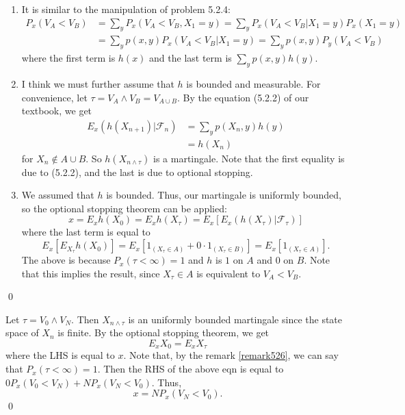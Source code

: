 \begin{problem}[5.2.7]\hfill
	
	\begin{enumerate}
		\item It is similar to the manipulation of problem 5.2.4: 
			\[
				\begin{split}
					P_x\left( V_A < V_B \right) & = \sum_{y}P_x\left( V_A < V_B, X_1 = y \right)
					= \sum_{y}P_x\left( V_A < V_B \lvert X_1 = y \right)P_x\left( X_1 = y \right) \\
					& = \sum_{y}p(x, y) P_x\left( V_A < V_B \lvert X_1 = y \right) = \sum_{y}p(x, y)P_y\left( V_A < V_B \right)
				\end{split}
			\]
			where the first term is $h(x)$ and the last term is $\sum_{y}p(x, y)h(y)$.

		\item I think we must further assume that $h$ is bounded and measurable.
			For convenience, let $\tau = V_A \wedge V_B = V_{A \cup B}$.
			By the equation (5.2.2) of our textbook, we get
			\[
				\begin{split}
					E_x\left( h(X_{n+1}) \lvert \mathcal{F}_n \right)
					&= \sum_y p(X_n, y)h(y) \\
					&= h(X_n)
				\end{split}
			\]
			for $X_n \notin A\cup B$.
			So $h(X_{n\wedge \tau})$ is a martingale.
			Note that the first equality is due to (5.2.2), and the last is due to optional stopping.
			
		\item We assumed that $h$ is bounded.
			Thus, our martingale is uniformly bounded, so the optional stopping theorem can be applied:
			\[
				x = E_x h(X_0) = E_x h(X_\tau) 
				= E_x \left[ E_x \left(h( X_\tau) \lvert \mathcal{F}_{\tau} \right) \right]
			\]
			where the last term is equal to
			\[
				E_x \left[ E_{X_\tau}h(X_0) \right] 
				= E_x\left[ 1_{(X_\tau \in A)} +0\cdot 1_{(X_\tau \in B)} \right]
				= E_x \left[ 1_{(X_\tau \in A)} \right].
			\]
			The above is because $P_x(\tau < \infty) = 1$ and $h$ is $1$ on $A$ and $0$ on $B$.	
			Note that this implies the result, since $X_\tau \in A$ is equivalent to $V_A < V_B$.
	\end{enumerate}

	\qed
\end{problem}

\begin{problem}[5.2.8]\hfill
	
	Let $\tau = V_0 \wedge V_N$.
	Then $X_{n\wedge \tau}$ is an uniformly bounded martingale since the state space of $X_n$ is finite.
	By the optional stopping theorem, we get
	\[
		E_x X_0 = E_x X_\tau
	\]
	where the LHS is equal to $x$.
	Note that, by the remark \ref{remark526}, we can say that $P_x\left( \tau < \infty \right) = 1$.
	Then the RHS of the above eqn is equal to $0 P_x\left( V_0 < V_N \right) + NP_x\left( V_N < V_0 \right)$.
	Thus,
	\[
		x = N P_x\left( V_N < V_0 \right).
	\]
	\qed
\end{problem}

